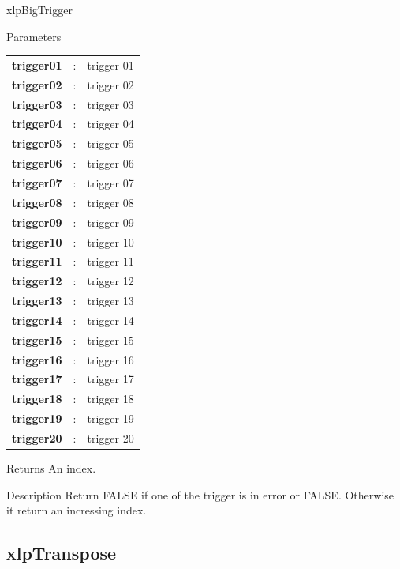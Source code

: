 \begin{xlpfunctitle}{xlpBigTrigger}

\begin{xlpfunc}{Parameters}
\begin{tabular}{p{3.5cm}cl}
\textbf{trigger01}& : & trigger 01 \\
\textbf{trigger02}& : & trigger 02 \\
\textbf{trigger03}& : & trigger 03 \\
\textbf{trigger04}& : & trigger 04 \\
\textbf{trigger05}& : & trigger 05 \\
\textbf{trigger06}& : & trigger 06 \\
\textbf{trigger07}& : & trigger 07 \\
\textbf{trigger08}& : & trigger 08 \\
\textbf{trigger09}& : & trigger 09 \\
\textbf{trigger10}& : & trigger 10 \\
\textbf{trigger11}& : & trigger 11 \\
\textbf{trigger12}& : & trigger 12 \\
\textbf{trigger13}& : & trigger 13 \\
\textbf{trigger14}& : & trigger 14 \\
\textbf{trigger15}& : & trigger 15 \\
\textbf{trigger16}& : & trigger 16 \\
\textbf{trigger17}& : & trigger 17 \\
\textbf{trigger18}& : & trigger 18 \\
\textbf{trigger19}& : & trigger 19 \\
\textbf{trigger20}& : & trigger 20 \\
\end{tabular}
\end{xlpfunc}


\begin{xlpfunc}{Returns}
An index.
\end{xlpfunc}

\begin{xlpfunc}{Description}
Return FALSE if one of the trigger is in error or FALSE. Otherwise it return an incressing index.
\end{xlpfunc}
\end{xlpfunctitle}


\subsection{xlpTranspose}

